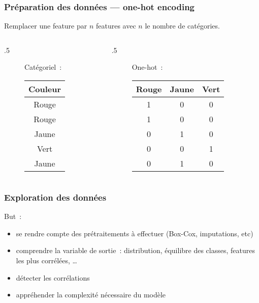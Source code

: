 \begin{frame}
  \frametitle{Préparation des données — one-hot encoding}
  Remplacer une feature par $n$ features avec $n$ le nombre de
  catégories.
  \begin{columns}
    \begin{column}{.5\tw}
      \begin{figure}
        \centering
        Catégoriel :\\[.5cm]
        \begin{tabular}{c}
          \toprule
          Couleur \\
          \midrule
          Rouge \\
          Rouge \\
          Jaune \\
          Vert \\
          Jaune \\
          \bottomrule
        \end{tabular}
      \end{figure}
    \end{column}
    \begin{column}{.5\tw}
      \begin{figure}
        \centering
        One-hot :\\[.5cm]
        \begin{tabular}{ccc}
          \toprule
          Rouge & Jaune & Vert \\
          \midrule
          1 & 0 & 0 \\
          1 & 0 & 0 \\
          0 & 1 & 0 \\
          0 & 0 & 1 \\
          0 & 1 & 0 \\
          \bottomrule
        \end{tabular}
      \end{figure}
    \end{column}
  \end{columns}
\end{frame}

\begin{frame}
  \frametitle{Exploration des données}
  But :
  \begin{itemize}[<+->]
  \item se rendre compte des prétraitements à effectuer (Box-Cox,
    imputations, etc)
  \item comprendre la variable de sortie : distribution, équilibre des
    classes, features les plus corrélées, …
  \item détecter les corrélations
  \item appréhender la complexité nécessaire du modèle
  \end{itemize}
\end{frame}

